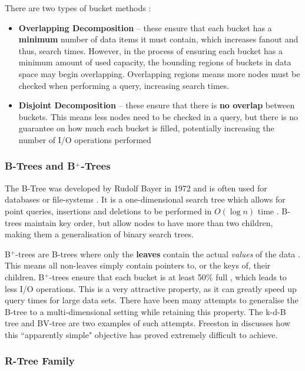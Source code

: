 There are two types of bucket methods \cite{md-structures-samet}:
\begin{itemize}
	\item \textbf{Overlapping Decomposition} -- these ensure that each bucket has a \textbf{minimum} number of data items it must contain, which increases fanout and thus, search times. However, in the process of ensuring each bucket has a minimum amount of used capacity, the bounding regions of buckets in data space may begin overlapping. Overlapping regions means more nodes must be checked when performing a query, increasing search times.
	\item \textbf{Disjoint Decomposition} -- these ensure that there is \textbf{no overlap} between buckets. This means less nodes need to be checked in a query, but there is no guarantee on how much each bucket is filled, potentially increasing the number of I/O operations performed
\end{itemize}

\subsubsection{B-Trees and B${}^{+}$-Trees}

The B-Tree was developed by Rudolf Bayer in 1972 and is often used for databases or file-systems \cite{ubiquitous-btree}. It is a one-dimensional search tree which allows for point queries, insertions and deletions to be performed in $O(\log n)$ time \cite{btree}. B-trees maintain key order, but allow nodes to have more than two children, making them a generalisation of binary search trees.

B${}^{+}$-trees are B-trees where only the \textbf{leaves} contain the actual \textit{values} of the data \cite{ubiquitous-btree}. This means all non-leaves simply contain pointers to, or the keys of, their children. B${}^{+}$-trees ensure that each bucket is at least 50\% full \cite{md-structures-samet, ubiquitous-btree}, which leads to less I/O operations. This is a very attractive property, as it can greatly speed up query times for large data sets. There have been many attempts to generalise the B-tree to a multi-dimensional setting while retaining this property. The k-d-B tree \cite{kdb-tree} and BV-tree \cite{bv-tree} are two examples of such attempts. Freeston in \cite{bv-tree} discusses how this ``apparently simple" objective has proved extremely difficult to achieve.

\subsubsection{R-Tree Family}

